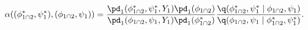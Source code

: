 \begin{equation}
  \alpha((\phi_{1 \cap 2}^{*}, \psi_{1}^{*}), (\phi_{1 \cap 2}, \psi_{1})) = 
  \frac {
    \pd_{1}(\phi_{1 \cap 2}^{*}, \psi_{1}^{*}, Y_{1})
    \pd_{1}(\phi_{1 \cap 2})
  } {
    \pd_{1}(\phi_{1 \cap 2}, \psi_{1}, Y_{1})
    \pd_{1}(\phi_{1 \cap 2}^{*})
  }
  \frac {
    \q(\phi_{1 \cap 2}^{*}, \psi_{1}^{*} \mid \phi_{1 \cap 2}, \psi_{1})
  } {
    \q(\phi_{1 \cap 2}, \psi_{1} \mid \phi_{1 \cap 2}^{*}, \psi_{1}^{*})
  }.
  \label{eqn:stage-one-acceptance-probability}
\end{equation}